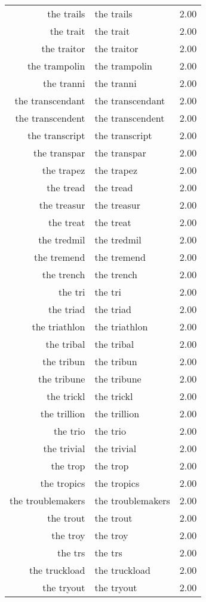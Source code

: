 \begin{table}[ht]
\begin{tabular}{rlr}
  the trails & the trails & 2.00 \\ 
  the trait & the trait & 2.00 \\ 
  the traitor & the traitor & 2.00 \\ 
  the trampolin & the trampolin & 2.00 \\ 
  the tranni & the tranni & 2.00 \\ 
  the transcendant & the transcendant & 2.00 \\ 
  the transcendent & the transcendent & 2.00 \\ 
  the transcript & the transcript & 2.00 \\ 
  the transpar & the transpar & 2.00 \\ 
  the trapez & the trapez & 2.00 \\ 
  the tread & the tread & 2.00 \\ 
  the treasur & the treasur & 2.00 \\ 
  the treat & the treat & 2.00 \\ 
  the tredmil & the tredmil & 2.00 \\ 
  the tremend & the tremend & 2.00 \\ 
  the trench & the trench & 2.00 \\ 
  the tri & the tri & 2.00 \\ 
  the triad & the triad & 2.00 \\ 
  the triathlon & the triathlon & 2.00 \\ 
  the tribal & the tribal & 2.00 \\ 
  the tribun & the tribun & 2.00 \\ 
  the tribune & the tribune & 2.00 \\ 
  the trickl & the trickl & 2.00 \\ 
  the trillion & the trillion & 2.00 \\ 
  the trio & the trio & 2.00 \\ 
  the trivial & the trivial & 2.00 \\ 
  the trop & the trop & 2.00 \\ 
  the tropics & the tropics & 2.00 \\ 
  the troublemakers & the troublemakers & 2.00 \\ 
  the trout & the trout & 2.00 \\ 
  the troy & the troy & 2.00 \\ 
  the trs & the trs & 2.00 \\ 
  the truckload & the truckload & 2.00 \\ 
  the tryout & the tryout & 2.00 \\ 

\end{tabular}
\end{table}
